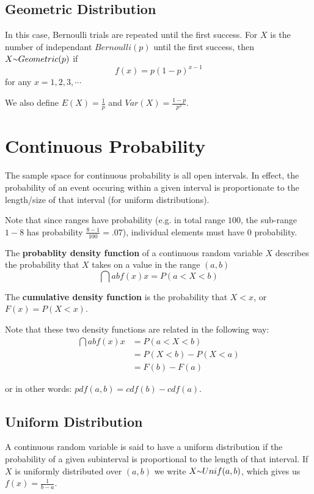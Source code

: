 \documentclass[12pt]{article}
\begin{document}
\subsection*{Geometric Distribution}
In this case, Bernoulli trials are repeated until the first success. For $X$ is the number of independant $Bernoulli(p)$ until the first success, then $X \ttilde Geometric(p)$ if \[ f(x) = p(1-p)^{x-1} \] for any $x = 1, 2, 3, \cdots$

We also define $E(X) = \frac{1}{p}$ and $Var(X) = \frac{1-p}{p^2}$.

\section*{Continuous Probability}
The sample space for continuous probability is all open intervals. In effect, the probability of an event occuring within a given interval is proportionate to the length/size of that interval (for uniform distributions).

Note that since ranges have probability (e.g. in total range $100$, the sub-range $1-8$ has probability $\frac{8-1}{100} = .07$), individual elements must have $0$ probability.

The {\bf probablity density function} of a continuous random variable $X$ describes the probability that $X$ takes on a value in the range $(a,b)$ \[\dint{a}{b}{f(x)}{x} = P(a < X < b) \]

The {\bf cumulative density function} is the probability that $X < x$, or $F(x) = P(X < x)$.

Note that these two density functions are related in the following way:
\begin{align*}
\dint{a}{b}{f(x)}{x} &= P(a < X < b)\\
                     &= P(X < b) - P(X < a)\\
                     &= F(b) - F(a)
\end{align*}

or in other words: $pdf(a,b) = cdf(b) - cdf(a)$.

\subsection*{Uniform Distribution}
A continuous random variable is said to have a uniform distribution if the probability of a given subinterval is proportional to the length of that interval. If $X$ is uniformly distributed over $(a,b)$ we write $X \ttilde Unif(a,b)$, which gives us $f(x) = \frac{1}{b-a}$.
\end{document}

